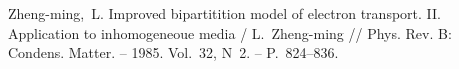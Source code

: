 \def\bibname{СПИСОК ИСПОЛЬЗОВАННЫХ ИСТОЧНИКОВ}
\begin{thebibliography}{99}
	\newcommand{\tabfix}{\hspace*{1.25cm}}
	 \tabfix Zheng-ming,~L. Improved bipartitition model 
		of electron transport. II. Application to inhomogeneoue media / 
		L.~Zheng-ming // Phys. Rev. B: Condens. Matter. -- 1985. Vol.~32, 
		N~2. -- P.~824--836.

\end{thebibliography}
